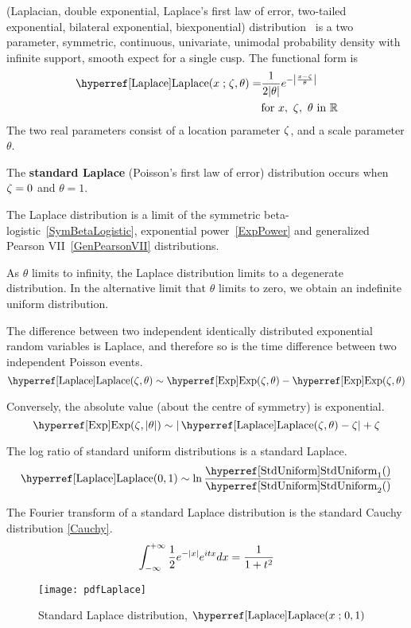 

\label{sec:Laplace}
 (Laplacian, double exponential, Laplace's first law of error, two-tailed exponential, bilateral exponential, biexponential) distribution~\cite{Laplace1774,Stigler1986,Kotz2001}
 is  a two parameter, symmetric, continuous, univariate, unimodal probability density with infinite support, smooth expect for a single cusp.
The functional form is
\begin{align}
\label{Laplace}
\opr{Laplace}(x\given \pLoc, \theta) = & 
\frac{1}{2 |\theta|} e^{- \Left| \frac{x-\pLoc}{\theta}\Right|} 		\checked
\\
\notag
& \text{for } x,\ \pLoc,\  \theta \text{ in }  \mathbb{R}			\checked
\end{align}
The two real parameters consist of a location parameter $\zeta$,  and a scale parameter $\theta$.




The {\bf standard Laplace} (Poisson's first law of error) distribution occurs when $\zeta=0$ and $\theta=1$.




The Laplace distribution is a limit of the symmetric beta-logistic~\eqref{SymBetaLogistic}, exponential power~\eqref{ExpPower} and generalized Pearson VII~\eqref{GenPearsonVII} distributions.

As $\theta$ limits to infinity, the Laplace distribution limits to a degenerate distribution. In the alternative limit that $\theta$ limits to zero, we obtain an indefinite uniform distribution.


The difference between two independent identically distributed exponential random variables is Laplace, and therefore so is the time difference between two independent Poisson events.
\[
\opr{Laplace}(\pLoc, \theta) \sim  \opr{Exp}(\pLoc,\theta) - \opr{Exp}(\pLoc,\theta)
\notag
\]

Conversely, the absolute value (about the centre of symmetry) is exponential. 
\[
\opr{Exp}(\pLoc, |\theta|) \sim  |\opr{Laplace}(\pLoc,\theta) - \pLoc | +\pLoc
\notag
\]


The log ratio of standard uniform distributions is a standard Laplace.
\[
\opr{Laplace}(0,1) \sim \ln \frac{\opr{StdUniform}_1() }{\opr{StdUniform}_2()} \checked
\notag
\]


The Fourier transform of a standard Laplace distribution is the standard Cauchy distribution \eqref{Cauchy}.
\[
\int_{-\infty}^{+\infty} \frac{1}{2}e^{-| x |} e^{i t x} dx = \frac{1}{1+t^2}
\checked
\notag
\]



\begin{figure}[t!]
\begin{center}
\texttt{[image: pdfLaplace]}
\end{center}
\caption[Standard Laplace distribution]{Standard Laplace distribution, $\opr{Laplace}(x\given 0,1)$}
\end{figure}


